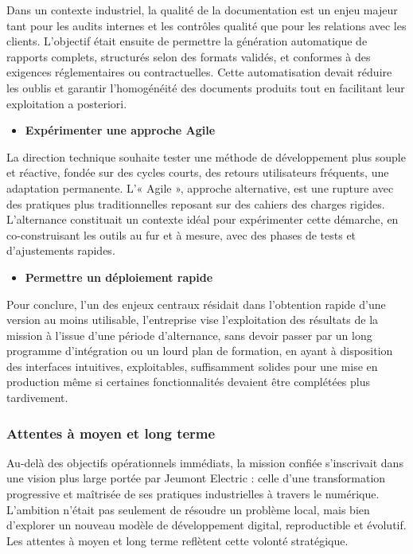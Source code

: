 \documentclass[11pt,a4paper]{article}
\begin{document}
Dans un contexte industriel, la qualité de la documentation est un enjeu majeur tant pour les audits internes et les contrôles qualité que pour les relations avec les clients. L’objectif était ensuite de permettre la génération automatique de rapports complets, structurés selon des formats validés, et conformes à des exigences réglementaires ou contractuelles. Cette automatisation devait réduire les oublis et garantir l’homogénéité des documents produits tout en facilitant leur exploitation a posteriori.

\begin{itemize}
\item \textbf{Expérimenter une approche Agile  } \
\end{itemize}

La direction technique souhaite tester une méthode de développement plus souple et réactive, fondée sur des cycles courts, des retours utilisateurs fréquents, une adaptation permanente. L’« Agile », approche alternative, est une rupture avec des pratiques plus traditionnelles reposant sur des cahiers des charges rigides. L’alternance constituait un contexte idéal pour expérimenter cette démarche, en co-construisant les outils au fur et à mesure, avec des phases de tests et d’ajustements rapides.

\newpage
\begin{itemize}
\item \textbf{Permettre un déploiement rapide  } 
\end{itemize}

Pour conclure, l’un des enjeux centraux résidait dans l’obtention rapide d’une version au moins utilisable, l’entreprise vise l’exploitation des résultats de la mission à l’issue d’une période d’alternance, sans devoir passer par un long programme d’intégration ou un lourd plan de formation, en ayant à disposition des interfaces intuitives, exploitables, suffisamment solides pour une mise en production même si certaines fonctionnalités devaient être complétées plus tardivement.
\subsubsection{Attentes à moyen et long terme}

Au-delà des objectifs opérationnels immédiats, la mission confiée s’inscrivait dans une vision plus large portée par Jeumont Electric : celle d’une transformation progressive et maîtrisée de ses pratiques industrielles à travers le numérique. L’ambition n’était pas seulement de résoudre un problème local, mais bien d’explorer un nouveau modèle de développement digital, reproductible et évolutif. Les attentes à moyen et long terme reflètent cette volonté stratégique. 
\end{document}
